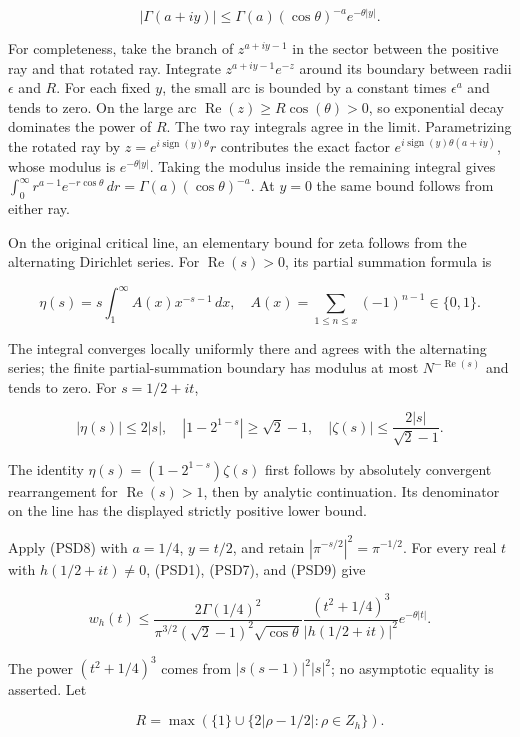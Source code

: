 \[
|\Gamma(a+iy)|
\le \Gamma(a)(\cos\theta)^{-a}e^{-\theta|y|}.
\tag{PSD8}
\]

For completeness, take the branch of \(z^{a+iy-1}\) in the sector between the positive ray and that rotated ray. Integrate \(z^{a+iy-1}e^{-z}\) around its boundary between radii \(\epsilon\) and \(R\). For each fixed \(y\), the small arc is bounded by a constant times \(\epsilon^a\) and tends to zero. On the large arc \(\operatorname{Re}(z)\ge R \cos(\theta)>0\), so exponential decay dominates the power of \(R\). The two ray integrals agree in the limit. Parametrizing the rotated ray by \(z=e^{i \operatorname{sign}(y) \theta}r\) contributes the exact factor \(e^{i \operatorname{sign}(y) \theta(a+iy)}\), whose modulus is \(e^{-\theta|y|}\). Taking the modulus inside the remaining integral gives \(\int_0^\infty r^{a-1}e^{-r\cos\theta}\,dr=\Gamma(a)(\cos\theta)^{-a}\). At \(y=0\) the same bound follows from either ray.

On the original critical line, an elementary bound for zeta follows from the alternating Dirichlet series. For \(\operatorname{Re}(s)>0\), its partial summation formula is

\[
\eta(s)=s\int_1^\infty A(x)x^{-s-1}\,dx,
\quad A(x)=\sum_{1\le n\le x}(-1)^{n-1}\in\{0,1\}.
\]

The integral converges locally uniformly there and agrees with the alternating series; the finite partial-summation boundary has modulus at most \(N^{-\operatorname{Re}(s)}\) and tends to zero. For \(s=1/2+it\),

\[
|\eta(s)|\le2|s|,
\quad |1-2^{1-s}|\ge\sqrt2-1,
\quad |\zeta(s)|\le\frac{2|s|}{\sqrt2-1}.
\tag{PSD9}
\]

The identity \(\eta(s)=(1-2^{1-s})\zeta(s)\) first follows by absolutely convergent rearrangement for \(\operatorname{Re}(s)>1\), then by analytic continuation. Its denominator on the line has the displayed strictly positive lower bound.

Apply (PSD8) with \(a=1/4\), \(y=t/2\), and retain \(|\pi^{-s/2}|^2=\pi^{-1/2}\). For every real \(t\) with \(h(1/2+it) \ne  0\), (PSD1), (PSD7), and (PSD9) give

\[
w_h(t)\le
\frac{2\Gamma(1/4)^2}
{\pi^{3/2}(\sqrt2-1)^2\sqrt{\cos\theta}}
\frac{(t^2+1/4)^3}{|h(1/2+it)|^2}
e^{-\theta|t|}.
\tag{PSD10}
\]

The power \((t^2+1/4)^3\) comes from \(|s(s-1)|^2|s|^2\); no asymptotic equality is asserted. Let

\[
R=\max\left(\{1\}\cup\{2|\rho-1/2|:\rho\in Z_h\}\right).
\]

